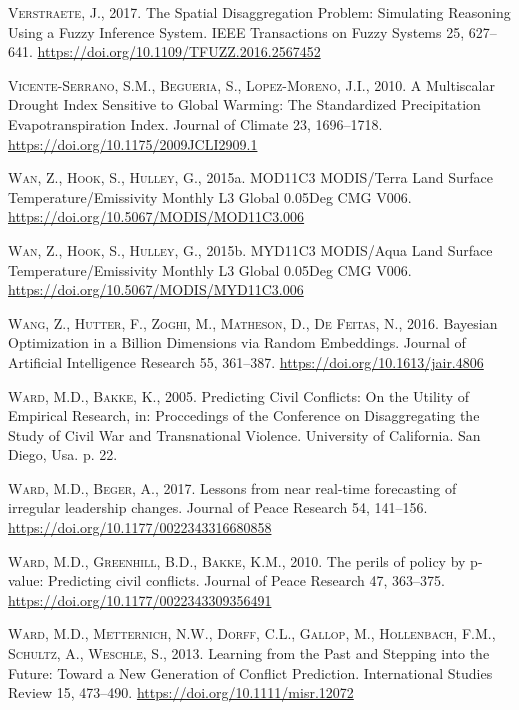 \documentclass[a4paper,11pt]{article}
\begin{document}
\leavevmode\hypertarget{ref-verstraete2017}{}%
\textsc{Verstraete, J.}, 2017. The Spatial Disaggregation Problem: Simulating Reasoning Using a Fuzzy Inference System. IEEE Transactions on Fuzzy Systems 25, 627--641. \url{https://doi.org/10.1109/TFUZZ.2016.2567452}

\leavevmode\hypertarget{ref-vicente2010}{}%
\textsc{Vicente-Serrano, S.M., Begueria, S., Lopez-Moreno, J.I.}, 2010. A Multiscalar Drought Index Sensitive to Global Warming: The Standardized Precipitation Evapotranspiration Index. Journal of Climate 23, 1696--1718. \url{https://doi.org/10.1175/2009JCLI2909.1}

\leavevmode\hypertarget{ref-wanzhengming2015}{}%
\textsc{Wan, Z., Hook, S., Hulley, G.}, 2015a. MOD11C3 MODIS/Terra Land Surface Temperature/Emissivity Monthly L3 Global 0.05Deg CMG V006. \url{https://doi.org/10.5067/MODIS/MOD11C3.006}

\leavevmode\hypertarget{ref-wanzhengming2015a}{}%
\textsc{Wan, Z., Hook, S., Hulley, G.}, 2015b. MYD11C3 MODIS/Aqua Land Surface Temperature/Emissivity Monthly L3 Global 0.05Deg CMG V006. \url{https://doi.org/10.5067/MODIS/MYD11C3.006}

\leavevmode\hypertarget{ref-wang2016}{}%
\textsc{Wang, Z., Hutter, F., Zoghi, M., Matheson, D., De Feitas, N.}, 2016. Bayesian Optimization in a Billion Dimensions via Random Embeddings. Journal of Artificial Intelligence Research 55, 361--387. \url{https://doi.org/10.1613/jair.4806}

\leavevmode\hypertarget{ref-ward2005a}{}%
\textsc{Ward, M.D., Bakke, K.}, 2005. Predicting Civil Conflicts: On the Utility of Empirical Research, in: Proccedings of the Conference on Disaggregating the Study of Civil War and Transnational Violence. University of California. San Diego, Usa. p. 22.

\leavevmode\hypertarget{ref-ward2017}{}%
\textsc{Ward, M.D., Beger, A.}, 2017. Lessons from near real-time forecasting of irregular leadership changes. Journal of Peace Research 54, 141--156. \url{https://doi.org/10.1177/0022343316680858}

\leavevmode\hypertarget{ref-ward2010}{}%
\textsc{Ward, M.D., Greenhill, B.D., Bakke, K.M.}, 2010. The perils of policy by p-value: Predicting civil conflicts. Journal of Peace Research 47, 363--375. \url{https://doi.org/10.1177/0022343309356491}

\leavevmode\hypertarget{ref-ward2013}{}%
\textsc{Ward, M.D., Metternich, N.W., Dorff, C.L., Gallop, M., Hollenbach, F.M., Schultz, A., Weschle, S.}, 2013. Learning from the Past and Stepping into the Future: Toward a New Generation of Conflict Prediction. International Studies Review 15, 473--490. \url{https://doi.org/10.1111/misr.12072}
\end{document}

